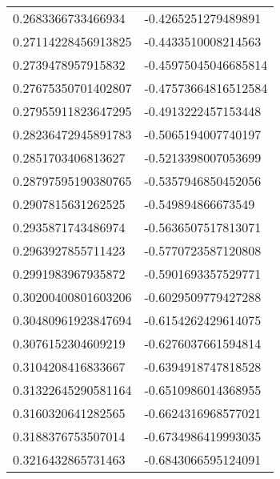 \begin{supertabular}{ll}
0.2683366733466934  & -0.4265251279489891   \\
0.27114228456913825 & -0.4433510008214563   \\
0.2739478957915832  & -0.45975045046685814  \\
0.27675350701402807 & -0.47573664816512584  \\
0.27955911823647295 & -0.4913222457153448   \\
0.28236472945891783 & -0.5065194007740197   \\
0.2851703406813627  & -0.5213398007053699   \\
0.28797595190380765 & -0.5357946850452056   \\
0.2907815631262525  & -0.549894866673549    \\
0.2935871743486974  & -0.5636507517813071   \\
0.2963927855711423  & -0.5770723587120808   \\
0.2991983967935872  & -0.5901693357529771   \\
0.30200400801603206 & -0.6029509779427288   \\
0.30480961923847694 & -0.6154262429614075   \\
0.3076152304609219  & -0.6276037661594814   \\
0.3104208416833667  & -0.6394918747818528   \\
0.31322645290581164 & -0.6510986014368955   \\
0.3160320641282565  & -0.6624316968577021   \\
0.3188376753507014  & -0.6734986419993035   \\
0.3216432865731463  & -0.6843066595124091   \\
\end{supertabular}
